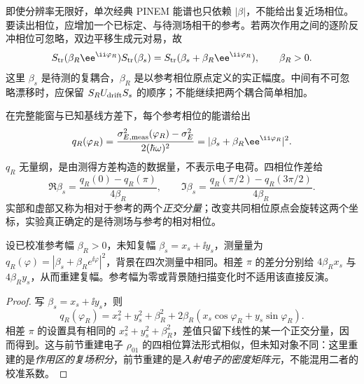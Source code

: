 即使分辨率无限好，单次经典 PINEM 能谱也只依赖 $|\beta|$，不能给出复近场相位。要读出相位，应增加一个已标定、与待测场相干的参考。若两次作用之间的逐阶反冲相位可忽略，双边平移生成元对易，故
\begin{equation}
 S_{\rm tr}(\beta_R\ee^{\ii\varphi_R})S_{\rm tr}(\beta_s)
 =S_{\rm tr}(\beta_s+\beta_R\ee^{\ii\varphi_R}),\qquad \beta_R>0.
 \label{eq:electron-nearfield-reference-composition}
\end{equation}
这里 $\beta_s$ 是待测的复耦合，$\beta_R$ 是以参考相位原点定义的实正幅度。中间有不可忽略漂移时，应保留 $S_RU_{\rm drift}S_s$ 的顺序；不能继续把两个耦合简单相加。

在完整能窗与已知基线方差下，每个参考相位的能谱给出
\begin{equation}
 q_R(\varphi_R)=\frac{\sigma_{E,\rm meas}^2(\varphi_R)-\sigma_E^2}{2(\hbar\omega)^2}
 =|\beta_s+\beta_R\ee^{\ii\varphi_R}|^2.
 \label{eq:electron-nearfield-quadrature-data}
\end{equation}
$q_R$ 无量纲，是由测得方差构造的数据量，不表示电子电荷。四相位作差给
\begin{equation}
 \Re\beta_s=\frac{q_R(0)-q_R(\pi)}{4\beta_R},\qquad
 \Im\beta_s=\frac{q_R(\pi/2)-q_R(3\pi/2)}{4\beta_R}.
 \label{eq:electron-nearfield-four-phase-field}
\end{equation}
实部和虚部又称为相对于参考的两个\emph{正交分量}；改变共同相位原点会旋转这两个坐标，实验真正确定的是待测场与参考的相对相位。

\begin{lemma}[四参考相位消除强度背景]
设已校准参考幅 $\beta_R>0$，未知复幅 $\beta_s=x_s+\ii y_s$，测量量为 $q_R(\varphi)=|\beta_s+\beta_Re^{\ii\varphi}|^2$，背景在四次测量中相同。相差 $\pi$ 的差分分别给 $4\beta_Rx_s$ 与 $4\beta_Ry_s$，从而重建复幅。参考幅为零或背景随扫描变化时不适用该直接反演。
\end{lemma}
\begin{proof}
写 $\beta_s=x_s+\ii y_s$，则
\begin{equation*}
 q_R(\varphi_R)=x_s^2+y_s^2+\beta_R^2
 +2\beta_R(x_s\cos\varphi_R+y_s\sin\varphi_R).
\end{equation*}
相差 $\pi$ 的设置具有相同的 $x_s^2+y_s^2+\beta_R^2$，差值只留下线性的某一个正交分量，因而得到。这与前节重建电子 $\rho_{01}$ 的四相位算法形式相似，但未知对象不同：这里重建的是\emph{作用区的复场积分}，前节重建的是\emph{入射电子的密度矩阵元}，不能混用二者的校准系数。
\end{proof}


